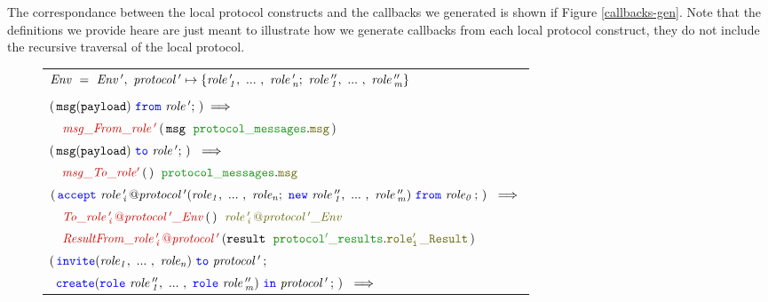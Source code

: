 \documentclass[12pt,twoside]{report}
\begin{document}
The correspondance between the local protocol constructs and the callbacks we generated is shown if Figure \ref{callbacks-gen}. Note that the definitions we provide heare are just meant to illustrate how we generate callbacks from each local protocol construct, they do not include the recursive traversal of the local protocol.\\

\begin{figure}[!h]
    \begin{center}
        \begin{tabular}{l}
            $\mathit{Env\ =\ Env\,',\ protocol\,' \mapsto \{\roles{role\,'}{n};\ \roles{role\,''}{m}\}}$\\\\

            $(\,\scrmessage{msg}{payload}\ \from\ \mathit{role\,'};\,) \implies$\\[6pt]
            
            $\quad \functionname{msg\_From\_role\,'}\,(\,\varname{msg}\ \;\pkgstructaccess{protocol\_messages}{msg}\,)\;\ $\\[15pt]
            
            $(\,\scrmessage{msg}{payload}\ \scrto\ \mathit{role\,'};\,)\ \implies$\\[6pt] 
            
            $\quad \functionname{msg\_To\_role'}\,(\,)\;\ \pkgstructaccess{protocol\_messages}{msg}$\\[15pt]
            
            $(\,\acceptL{role\,'_i\,@protocol\,'}{role}{role\,''}{role_0}\,;\,)\ \implies$\\[6pt]
            
            $\quad \functionname{To\_\localprotocol{role\,'_i\,}{protocol\,'}\_Env}\,(\,)\;\ \interfacename{\localprotocol{role\,'_i\,}{protocol\,'}\_Env}$\\[3pt]

            $\quad \functionname{ResultFrom\_\localprotocol{role\,'_i\,}{protocol\,'}}\,(\varname{result}\ \;\pkgstructaccess{protocol'\_results}{role'_i\,\_Result}\,)\;$\\[15pt]

            $(\,\invite(\roles{role}{n})\ \scrto\ \mathit{protocol\,'}\,;$\\[1.5pt] 
            $\ \,\create(\rolessig{role\,''}{m})\ \scrin\ \mathit{protocol\,'}\,;\,)\ \implies$\\[6pt]
            

\end{tabular}
\end{center}
\end{figure}
\end{document}
